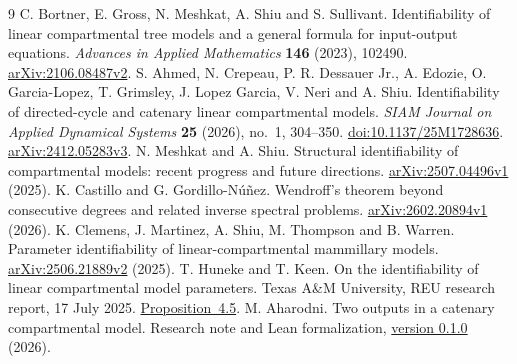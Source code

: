 \documentclass[11pt,a4paper]{article}
\begin{document}
\begin{thebibliography}{9}
 C. Bortner, E. Gross, N. Meshkat, A. Shiu and S. Sullivant.
Identifiability of linear compartmental tree models and a general formula
for input-output equations. \textit{Advances in Applied Mathematics}
\textbf{146} (2023), 102490.
\href{https://arxiv.org/abs/2106.08487v2}{arXiv:2106.08487v2}.
 S. Ahmed, N. Crepeau, P. R. Dessauer Jr., A. Edozie,
O. Garcia-Lopez, T. Grimsley, J. Lopez Garcia, V. Neri and A. Shiu.
Identifiability of directed-cycle and catenary linear compartmental models.
\textit{SIAM Journal on Applied Dynamical Systems} \textbf{25} (2026),
no.~1, 304--350.
\href{https://doi.org/10.1137/25M1728636}{doi:10.1137/25M1728636}.
\href{https://arxiv.org/abs/2412.05283v3}{arXiv:2412.05283v3}.
 N. Meshkat and A. Shiu. Structural identifiability of
compartmental models: recent progress and future directions.
\href{https://arxiv.org/abs/2507.04496v1}{arXiv:2507.04496v1} (2025).
 K. Castillo and G. Gordillo-Núñez. Wendroff's theorem beyond
consecutive degrees and related inverse spectral problems.
\href{https://arxiv.org/abs/2602.20894v1}{arXiv:2602.20894v1} (2026).
 K. Clemens, J. Martinez, A. Shiu, M. Thompson and B. Warren.
Parameter identifiability of linear-compartmental mammillary models.
\href{https://arxiv.org/abs/2506.21889v2}{arXiv:2506.21889v2} (2025).
 T. Huneke and T. Keen. On the identifiability of linear
compartmental model parameters. Texas A\&M University, REU research report,
17 July 2025. \href{https://artsci.tamu.edu/mathematics/_files/_docs/reu/results/2025/huneke-keen-report.pdf}{Proposition~4.5}.
 M. Aharodni. Two outputs in a
catenary compartmental model. Research note and Lean formalization,
\href{https://github.com/qqhgdkktu/catenary-identifiability/tree/v0.1.0}{version 0.1.0} (2026).
\end{thebibliography}
\end{document}
